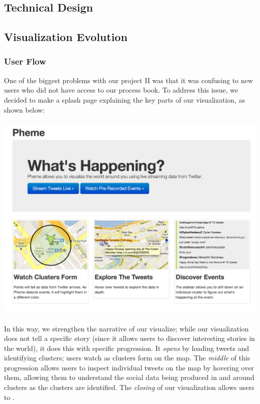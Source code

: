 \documentclass[pdftex,12pt,a4paper]{article}
\begin{document}
\subsection{Technical Design}

\subsection{Visualization Evolution}
\subsubsection{User Flow}
One of the biggest problems with our project II was that it was confusing to new users who did not have access to our process book. To address this issue, we decided to make a splash page explaining the key parts of our visualization, as shown below: \\ \\
\includegraphics[width=5.5in]{splash.png} \\ \\
In this way, we strengthen the narrative of our visualize; while our visualization does not tell a specific story (since it allows users to discover interesting stories in the world), it does this with specific progression. It \emph{opens} by loading tweets and identifying clusters; users watch as clusters form on the map. The \emph{middle} of this progression allows users to inspect individual tweets on the map by hovering over them, allowing them to understand the social data being produced in and around clusters as the clusters are identified. The \emph{closing} of our visualization allows users to  .
\end{document}
